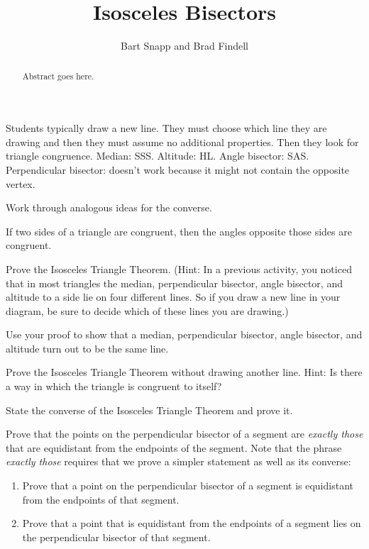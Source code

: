 \documentclass{ximera}
\title{Isosceles Bisectors}
\author{Bart Snapp and Brad Findell}
\begin{document}
\begin{abstract}
Abstract goes here.  
\end{abstract}
\maketitle

\begin{teachingnote}
Students typically draw a new line. They must choose which line they are drawing and then they must assume no additional properties.  Then they look for triangle congruence.  Median: SSS.  Altitude: HL.  Angle bisector: SAS. Perpendicular bisector: doesn't work because it might not contain the opposite vertex.  

Work through analogous ideas for the converse. 
\end{teachingnote}

\begin{theorem}
If two sides of a triangle are congruent, then the angles opposite those sides are congruent. 
\end{theorem}

\begin{problem}
Prove the Isosceles Triangle Theorem.  (Hint: In a previous activity, you noticed that in most triangles the median, perpendicular bisector, angle bisector, and altitude to a side lie on four different lines.  So if you draw a new line in your diagram, be sure to decide which of these lines you are drawing.)
\end{problem}
\vfill

\begin{problem}
Use your proof to show that a median, perpendicular bisector, angle bisector, and altitude turn out to be the same line.
\end{problem}
\vfill
\newpage

\begin{problem}
Prove the Isosceles Triangle Theorem without drawing another line.  Hint:  Is there a way in which the triangle is congruent to itself? 
\end{problem}
\vfill

\begin{problem}
State the converse of the Isosceles Triangle Theorem and prove it.  
\end{problem}
\vfill
\newpage
\begin{problem}
Prove that the points on the perpendicular bisector of a segment are \emph{exactly those} that are equidistant from the endpoints of the segment.  Note that the phrase \emph{exactly those} requires that we prove a simpler statement as well as its converse:   
\begin{enumerate}
\item Prove that a point on the perpendicular bisector of a segment is equidistant from the endpoints of that segment.
\item Prove that a point that is equidistant from the endpoints of a segment lies on the perpendicular bisector of that segment.
\end{enumerate}
\end{problem}
\end{document}
